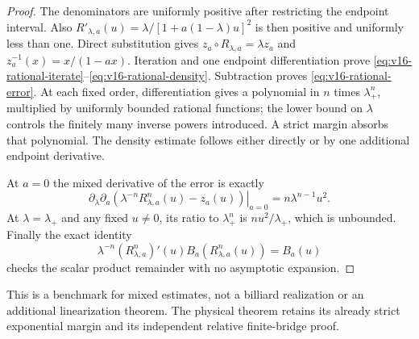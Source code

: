 \begin{proof}
The denominators are uniformly positive after restricting the endpoint
interval. Also $R'_{\lambda,a}(u)=\lambda/[1+a(1-\lambda)u]^2$
is then positive and uniformly less than one. Direct substitution gives
$z_a\circ R_{\lambda,a}=\lambda z_a$ and
$z_a^{-1}(x)=x/(1-ax)$. Iteration and one endpoint differentiation prove
\eqref{eq:v16-rational-iterate}--\eqref{eq:v16-rational-density}.
Subtraction proves \eqref{eq:v16-rational-error}. At each fixed order,
differentiation gives a polynomial in $n$ times $\lambda_+^n$, multiplied
by uniformly bounded rational functions; the lower bound on $\lambda$
controls the finitely many inverse powers introduced. A strict margin
absorbs that polynomial. The density estimate follows either directly
or by one additional endpoint derivative.

At $a=0$ the mixed derivative of the error is exactly
\[
 \left.\partial_\lambda\partial_a
   (\lambda^{-n}R_{\lambda,a}^n(u)-z_a(u))\right|_{a=0}
                         =n\lambda^{n-1}u^2.
\]
At $\lambda=\lambda_+$ and any fixed $u\ne0$, its ratio to
$\lambda_+^n$ is $nu^2/\lambda_+$, which is unbounded. Finally the
exact identity
\[
 \lambda^{-n}(R_{\lambda,a}^n)'(u)
                  B_a(R_{\lambda,a}^n(u))=B_a(u)
\]
checks the scalar product remainder with no asymptotic expansion.
\end{proof}

This is a benchmark for mixed estimates, not a billiard realization
or an additional linearization theorem. The physical theorem retains
its already strict exponential margin and its independent relative
finite-bridge proof.
